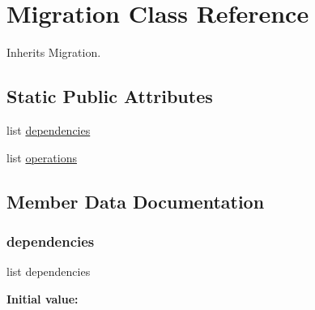 \hypertarget{classjoinapp_1_1migrations_1_10002__auto__20190605__1443_1_1_migration}{}\section{Migration Class Reference}
\label{classjoinapp_1_1migrations_1_10002__auto__20190605__1443_1_1_migration}


Inherits Migration.

\subsection*{Static Public Attributes}
\begin{DoxyCompactItemize}
\item 
list \mbox{\hyperlink{classjoinapp_1_1migrations_1_10002__auto__20190605__1443_1_1_migration_a2bf1a0da0a83299e260789a8473d7460}{dependencies}}
\item 
list \mbox{\hyperlink{classjoinapp_1_1migrations_1_10002__auto__20190605__1443_1_1_migration_a33f24b85692683d7286389f0224a3d13}{operations}}
\end{DoxyCompactItemize}


\subsection{Member Data Documentation}
\mbox{\label{classjoinapp_1_1migrations_1_10002__auto__20190605__1443_1_1_migration_a2bf1a0da0a83299e260789a8473d7460}} 
\subsubsection{\texorpdfstring{dependencies}{dependencies}}
{\footnotesize\ttfamily list dependencies\hspace{0.3cm}{\ttfamily [static]}}

{\bfseries Initial value\+:}
\begin{DoxyCode}{0}
\DoxyCodeLine{=  [}
\DoxyCodeLine{        (\textcolor{stringliteral}{'joinapp'}, \textcolor{stringliteral}{'0001\_initial'}),}
\DoxyCodeLine{    ]}

\end{DoxyCode}
\mbox{\label{classjoinapp_1_1migrations_1_10002__auto__20190605__1443_1_1_migration_a33f24b85692683d7286389f0224a3d13}} 
